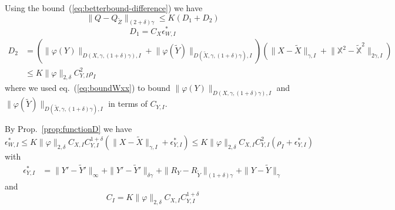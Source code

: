 \documentclass[a4paper,12pt,reqno]{amsproc}
\newcommand{\norm}[1]{\lVert #1\rVert}
\newcommand{\wt}{\widetilde}
\begin{document}
Using the bound~(\ref{eq:betterbound-difference})
we have
\begin{equation}
  \label{eq:boundQ}
  \norm{Q- Q_{\wt Z}}_{(2+\delta)\gamma} \le  K (D_1+D_2)
\end{equation}
$$
D_1 = C_X \epsilon^*_{W,I}
$$
\begin{equation*}
  \begin{split}
D_2  & =
(\norm{\varphi(Y)}_{D(X,\gamma,(1+\delta)\gamma),I}+\norm{\varphi(\wt Y)}_{D(\widetilde X,\gamma,(1+\delta)\gamma),I})(\norm{X-\widetilde X}_{\gamma,I}  +
\norm{\mathbb{X}^2-\mathbb{\widetilde X}^2}_{2\gamma,I}) 
\\ & \le  K
\norm{\varphi}_{2,\delta} C_{Y,I}^2 \rho_I    
  \end{split}
\end{equation*}
where we used eq.~(\ref{eq:boundWxx}) to bound
$\norm{\varphi(Y)}_{D(X,\gamma,(1+\delta)\gamma),I}$ and
$\norm{\varphi(\wt Y)}_{D(\wt X,\gamma,(1+\delta)\gamma),I}$ in terms
of $C_{Y,I}$.

By Prop.~\ref{prop:functionD} we have
\begin{equation}
  \label{eq:function_difference-xx}
\epsilon^*_{W,I}  \le K
 \norm{\varphi}_{2,\delta} C_{X,I}
 C_{Y,I}^{1+\delta} 
(\|X-\widetilde X\|_{\gamma,I} + \epsilon^*_{Y,I}) \le K
 \norm{\varphi}_{2,\delta} C_{X,I}
 C_{Y,I}^{2} 
(\rho_I + \epsilon^*_{Y,I})   
\end{equation}
with 
\begin{equation*}
  \begin{split}
\epsilon^*_{Y,I} & = \|Y'-\widetilde Y'\|_\infty + \|Y'-\widetilde
Y'\|_{\delta\gamma} +
\|R_Y-R_{\widetilde Y}\|_{(1+\delta)\gamma} +\|Y-\widetilde Y\|_\gamma
  \end{split}
\end{equation*}
and
$$
C_{I} =  K
 \norm{\varphi}_{2,\delta} C_{X,I}
 C_{Y,I}^{1+\delta} 
$$
\end{document}
